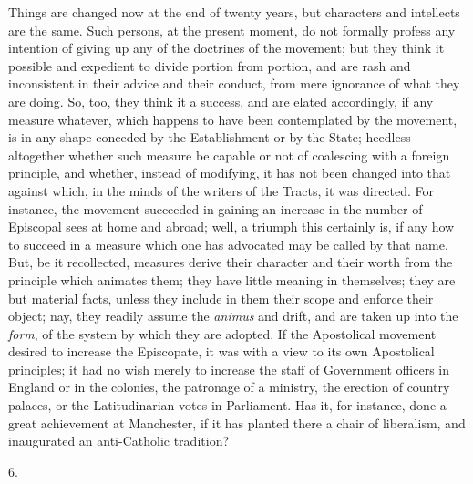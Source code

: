 Things are changed now at the end of twenty years, but characters
and intellects are the same. Such persons, at the present moment, do
not formally profess any intention of giving up any of the doctrines
of the movement; but they think it possible and expedient to divide
portion from portion, and are rash and inconsistent in their advice
and their conduct, from mere ignorance of what they are doing. So,
too, they think it a success, and are elated accordingly, if any
measure whatever, which happens to have been contemplated by the
movement, is in any shape conceded by the Establishment or by the
State; heedless altogether whether such measure be capable or not of
coalescing with a foreign principle, and whether, instead of
modifying, it has not been changed into that against which, in the
minds of the writers of the Tracts, it was directed. For instance, the
movement succeeded in gaining an increase in the number of Episcopal
sees at home and abroad; well, a triumph this certainly is, if any how
to succeed in a measure which one has advocated may be called by that
name. But, be it recollected, measures derive their character and
their worth from the principle which animates them; they have little
meaning in themselves; they are but material facts, unless they
include in them their scope and enforce their object; nay, they
readily assume the \emph{animus} and drift, and are taken up into the \emph{form},
of the system by which they are adopted. If the Apostolical movement
desired to increase the Episcopate, it was with a view to its own
Apostolical principles; it had no wish merely to increase the staff of
Government officers in England or in the colonies, the patronage of a
ministry, the erection of country palaces, or the Latitudinarian votes
in Parliament. Has it, for instance, done a great achievement at
Manchester, if it has planted there a chair of liberalism, and
inaugurated an anti-Catholic tradition?

6.

